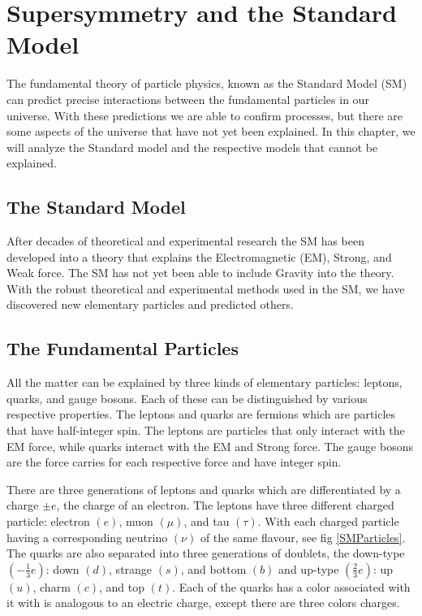 \chapter{Supersymmetry and the Standard Model}
\label{ch:SUSY}

The fundamental theory of particle physics, known as the Standard Model (SM) can predict precise interactions between the fundamental particles in our universe. With these predictions we are able to confirm processes, but there are some aspects of the universe that have not yet been explained. In this chapter, we will analyze the Standard model and the respective models that cannot be explained.

\section{The Standard Model}
\label{sec:SM}

After decades of theoretical and experimental research the SM has been developed into a theory that explains the Electromagnetic (EM), Strong, and Weak force. The SM has not yet been able to include Gravity into the theory. With the robust theoretical and experimental methods used in the SM, we have discovered new elementary particles and predicted others. 

\section{The Fundamental Particles}

 All the matter can be explained by three kinds of elementary particles: leptons, quarks, and gauge bosons. Each of these can be distinguished by various respective properties. The leptons and quarks are fermions which are particles that have half-integer spin. The leptons are particles that only interact with the EM force, while quarks interact with the EM and Strong force. The gauge bosons are the force carries for each respective force and have integer spin. 
 
 There are three generations of leptons and quarks which are differentiated by a charge $\pm e$, the charge of an electron. The leptons have three different charged particle: electron $(e)$, muon $(\mu)$, and tau $(\tau)$. With each charged particle having a corresponding neutrino $(\nu)$ of the same flavour, see fig \ref{SMParticles}. The quarks are also separated into three generations of doublets, the down-type $(-\frac{1}{3}e)$: down $(d)$, strange $(s)$, and bottom $(b)$ and up-type $(\frac{2}{3}e)$: up $(u)$, charm $(c)$, and top $(t)$. Each of the quarks has a color associated with it with is analogous to an electric charge, except there are three colors charges. 
 
